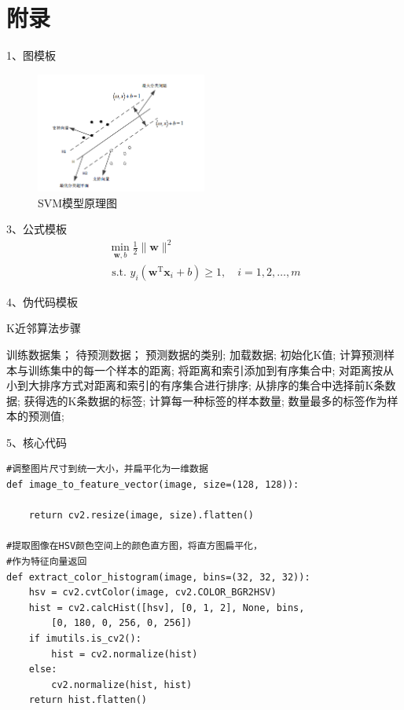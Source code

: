\documentclass{article}
\begin{document}
\section{附录}
\begin{appendices}
    1、图模板
    \begin{figure}[htpb]
        \centering
        \includegraphics[width=0.5\textwidth]{svm.png}
        \caption{SVM模型原理图}
        \label{fig:svm}
    \end{figure}

    3、公式模板
    \begin{equation}\label{eq:svmsuper}
        \begin{array}{l}
            \min _{\boldsymbol{w}, b} \frac{1}{2}\|\boldsymbol{w}\|^{2} \\
            \text { s.t. } y_{i}\left(\boldsymbol{w}^{\mathrm{T}} \boldsymbol{x}_{i}+b\right) \geqslant 1, \quad i=1,2, \ldots, m
        \end{array}
    \end{equation}


    4、伪代码模板
    \begin{algorithm}[H]
        \caption{ K近邻算法步骤}
        \begin{algorithmic}[1]
            \Require
            训练数据集；
            待预测数据；
            \Ensure
            预测数据的类别;
            \State 加载数据;
            \State 初始化K值;
            \State 计算预测样本与训练集中的每一个样本的距离;
            \State 将距离和索引添加到有序集合中;
            \State 对距离按从小到大排序方式对距离和索引的有序集合进行排序;
            \State 从排序的集合中选择前K条数据;
            \State 获得选的K条数据的标签;
            \State 计算每一种标签的样本数量;
            \Return
            数量最多的标签作为样本的预测值;
        \end{algorithmic}
    \end{algorithm}


    5、核心代码
    \lstset{language=Python}
    \begin{lstlisting}
#调整图片尺寸到统一大小，并扁平化为一维数据
def image_to_feature_vector(image, size=(128, 128)):

	return cv2.resize(image, size).flatten()

#提取图像在HSV颜色空间上的颜色直方图，将直方图扁平化，
#作为特征向量返回
def extract_color_histogram(image, bins=(32, 32, 32)):
	hsv = cv2.cvtColor(image, cv2.COLOR_BGR2HSV)
	hist = cv2.calcHist([hsv], [0, 1, 2], None, bins,
		[0, 180, 0, 256, 0, 256])
	if imutils.is_cv2():
		hist = cv2.normalize(hist)
	else:
		cv2.normalize(hist, hist)
	return hist.flatten()

    \end{lstlisting}
\end{appendices}
\end{document}

